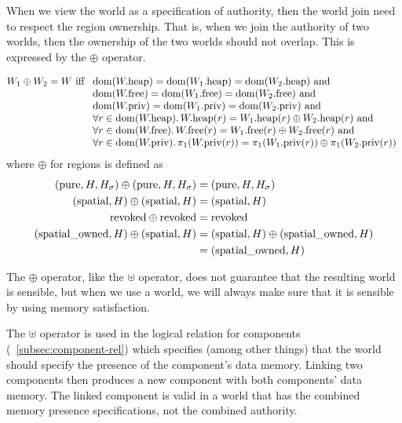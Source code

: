 \begin{jversion}
When we view the world as a specification of authority, then the world join need to respect the region ownership.
That is, when we join the authority of two worlds, then the ownership of the two worlds should not overlap.
This is expressed by the $\oplus$ operator.
\begin{definition}
  \[
    W_1 \oplus W_2 = W
  \text{ iff }
  \begin{array}[t]{l}
    \dom(\pwheap) = \dom(\pwheap[W_1]) = \dom(\pwheap[W_2]) \tand \\
    \dom(\pwfree) = \dom(\pwfree[W_1]) = \dom(\pwfree[W_2]) \tand \\
    \dom(\pwpriv) = \dom(\pwpriv[W_1]) = \dom(\pwpriv[W_2]) \tand \\
    \forall r \in \dom(\pwheap) \ldotp \pwheap(r) = \pwheap[W_1](r) \oplus \pwheap[W_2](r) \tand \\
    \forall r \in \dom(\pwfree) \ldotp \pwfree(r) = \pwfree[W_1](r) \oplus \pwfree[W_2](r) \tand \\
    \forall r \in \dom(\pwpriv) \ldotp \pi_1(\pwpriv(r)) = \pi_1(\pwpriv[W_1](r)) \oplus \pi_1(\pwpriv[W_2](r))
  \end{array}
  \]
  where $\oplus$ for regions is defined as
\begin{align*}
  (\pure,H,H_\sigma) \oplus (\pure,H,H_\sigma) =  & \; (\pure,H,H_\sigma) \\
  (\spatial,H) \oplus (\spatial,H) =  & \; (\spatial,H) \\
  \revoked \oplus \revoked = & \; \revoked \\
  (\spatialo,H) \oplus (\spatial,H) = & \; (\spatial,H) \oplus (\spatialo,H)\\
                                           =  & \; (\spatialo,H)
\end{align*}
\end{definition}
The $\oplus$ operator, like the $\uplus$ operator, does not guarantee that the resulting world is sensible, but when we use a world, we will always make sure that it is sensible by using memory satisfaction.

The $\uplus$ operator is used in the logical relation for components (\sectionname~\ref{subsec:component-rel}) which specifies (among other things) that the world should specify the presence of the component's data memory.
Linking two components then produces a new component with both components' data memory.
The linked component is valid in a world that has the combined memory presence specifications, not the combined authority.


\end{jversion}
